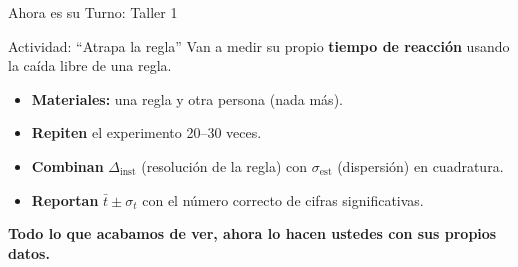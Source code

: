 \documentclass[aspectratio=169,xcolor=dvipsnames]{beamer}
\begin{document}
\begin{frame}{Ahora es su Turno: Taller 1}
	\begin{block}{Actividad: ``Atrapa la regla''}
		\centering
		Van a medir su propio \textbf{tiempo de reacción} usando la caída libre de una regla.
	\end{block}

	\vspace{0.3cm}
	\begin{itemize}
		\setlength{\itemsep}{8pt}
		\item \textbf{Materiales:} una regla y otra persona (nada más).
		\item \textbf{Repiten} el experimento 20--30 veces.
		\item \textbf{Combinan} $\Delta_{\text{inst}}$ (resolución de la regla) con $\sigma_{\text{est}}$ (dispersión) en cuadratura.
		\item \textbf{Reportan} $\bar t \pm \sigma_t$ con el número correcto de cifras significativas.
	\end{itemize}

	\vspace{0.4cm}
	\begin{center}
		\large \textcolor{UnalGreen}{\textbf{Todo lo que acabamos de ver, ahora lo hacen ustedes con sus propios datos.}}
	\end{center}
\end{frame}
\end{document}

